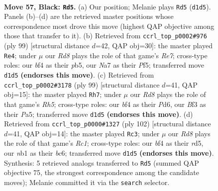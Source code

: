 \documentclass[11pt]{article}
\begin{document}
\clearpage

\begin{figure}[p]\centering
\begin{subfigure}{0.46\textwidth}\centering
\resizebox{\linewidth}{!}{%
\newchessgame
\chessboard[
  setfen={4k2K/n1P5/p7/P4p1p/4pB2/5bP1/8/RN1r4 b - - 21 57},
  showmover=false,
  pgfstyle=straightmove, color=movearrow, markmove={d1-d5}
]}
\caption{}
\end{subfigure}\hfill
\begin{subfigure}{0.46\textwidth}\centering
\resizebox{\linewidth}{!}{%
\newchessgame
\chessboard[
  setfen={8/2p5/1p3k2/pP3p2/Pb1P3P/1B1R4/4rPK1/8 b - - 0 50},
  showmover=false,
  pgfstyle=straightmove, color=movearrow, markmove={e2-e4}
]}
\caption{}
\end{subfigure}
\\[4pt]
\begin{subfigure}{0.46\textwidth}\centering
\resizebox{\linewidth}{!}{%
\newchessgame
\chessboard[
  setfen={8/8/1p1p1k2/p5p1/P1P3Br/b3P3/4KP2/6R1 b - - 27 50},
  showmover=false,
  pgfstyle=straightmove, color=movearrow, markmove={h4-h7}
]}
\caption{}
\end{subfigure}\hfill
\begin{subfigure}{0.46\textwidth}\centering
\resizebox{\linewidth}{!}{%
\newchessgame
\chessboard[
  setfen={8/1p6/2b3k1/3r2pp/8/P3B2P/5PPK/2R5 w - - 42 52},
  showmover=false,
  pgfstyle=straightmove, color=movearrow, markmove={c1-c3}
]}
\caption{}
\end{subfigure}
\caption{\textbf{Move 57, Black: \texttt{Rd5}.} (a) Our position; Melanie plays \texttt{Rd5} (\texttt{d1d5}). Panels (b)--(d) are the retrieved master positions whose correspondence most drove this move (highest QAP objective among those that transfer to it). (b) Retrieved from \texttt{ccrl\_top\_p0002\#976} (ply 99) [structural distance $d$=42, QAP obj=30]: the master played \texttt{Re4}; under $\mu$ our \emph{Rd8} plays the role of that game's \emph{Re7}; cross-type roles: our \emph{b}f4 as their \emph{p}b5, our \emph{N}a7 as their \emph{P}f5; transferred move \texttt{d1d5} \textbf{(endorses this move)}. (c) Retrieved from \texttt{ccrl\_top\_p0002\#3178} (ply 99) [structural distance $d$=41, QAP obj=15]: the master played \texttt{Rh7}; under $\mu$ our \emph{Rd8} plays the role of that game's \emph{Rh5}; cross-type roles: our \emph{b}f4 as their \emph{P}d6, our \emph{B}f3 as their \emph{P}a5; transferred move \texttt{d1d5} \textbf{(endorses this move)}. (d) Retrieved from \texttt{ccrl\_top\_p0000\#1327} (ply 102) [structural distance $d$=41, QAP obj=14]: the master played \texttt{Rc3}; under $\mu$ our \emph{Rd8} plays the role of that game's \emph{Rc1}; cross-type roles: our \emph{b}f4 as their \emph{r}d5, our \emph{n}b1 as their \emph{b}c6; transferred move \texttt{d1d5} \textbf{(endorses this move)}. Synthesis: 5 retrieved analogs transferred to \texttt{Rd5} (summed QAP objective 75, the strongest correspondence among the candidate moves); Melanie committed it via the \texttt{search} selector.}
\label{fig:thought-m113}
\end{figure}
\end{document}
